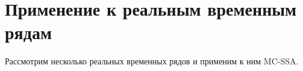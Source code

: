 \documentclass[specialist,
substylefile = spbu_report.rtx,
subf,href,colorlinks=true, 12pt]{disser}
\theoremstyle{definition}
\begin{document}


\section{Применение к реальным временным рядам}\label{sect:examples}
Рассмотрим несколько реальных временных рядов и применим к ним MC-SSA.
\end{document}
